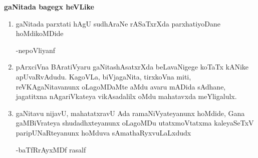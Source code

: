 \begin{center}
{\bf gaNitada bagegx heVLike}
\end{center}

\begin{enumerate}[\rm 1)]
\item gaNitada parxtati hAgU sudhAraNe rASaTxrXda parxhatiyoDane hoMdikoMDide

\hfill{-nepoVliyanf}

\item pArxciVna BAratiVyaru gaNitashAsatxrXda beLavaNigege koTaTx kANike apUvaRvAdudu. KagoVLa, biVjagaNita, tirxkoVna miti, reVKAgaNitavanunx oLagoMDaMte aMdu avaru mADida sAdhane, jagatitxna nAgariVkateya vikAsadalilx oMdu mahatavxda meYligalulx.

\item gaNitavu nijavU, mahatatxravU Ada ramaNiVyateyanunx hoMdide, Gana gaMBiVrateya shudadhxteyanunx oLagoMDu utatxmoVtatxma kaleyaSeTxV paripUNaR\-teyanunx hoMduva sAmathaRyxvuLaLxdudx 

\hfill{-baTfRrAyxMDf rasalf}

\end{enumerate}

